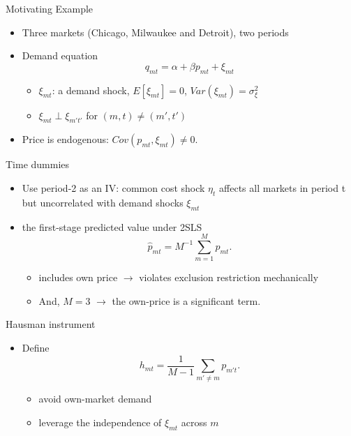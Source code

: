 \documentclass[notes,11pt, aspectratio=169]{beamer}
\begin{document}
\begin{frame}{Motivating Example}

\begin{itemize}

    \item Three markets (Chicago, Milwaukee and Detroit), two periods
    \item Demand equation
    \[
        q_{mt} = \alpha + \beta p_{mt} + \xi_{mt}
    \]
    \begin{itemize}
        \item $\xi_{mt}$: a demand shock, $E[\xi_{mt}] = 0$, $Var(\xi_{mt}) = \sigma_\xi^2$
        \item $\xi_{mt} \perp \xi_{m't'}$ for $(m,t) \neq (m',t')$
    \end{itemize}
    \item Price is endogenous: $Cov(p_{mt}, \xi_{mt}) \neq 0$.
    
\end{itemize}
    
\end{frame}

\begin{frame}{Time dummies}

\begin{itemize}
    \item Use period-2 as an IV: common cost shock $\eta_t$ affects all markets in period t but uncorrelated with demand shocks $\xi_{mt}$
    \item the first-stage predicted value under 2SLS 
    \[
     \hat{p}_{mt} = M^{-1}\sum_{m=1}^{M}p_{mt}.
    \]
    \begin{itemize}
        \item includes own price $\rightarrow$ violates exclusion restriction mechanically
        \item And, $M=3$ $\rightarrow$ the own-price is a significant term.
    \end{itemize}
\end{itemize}
    
\end{frame}

\begin{frame}{Hausman instrument}

\begin{itemize}
    \item Define 
    \[
     h_{mt} = \frac{1}{M-1} \sum_{m' \neq m} p_{m't}.
    \]
    \begin{itemize}
        \item avoid own-market demand 
        \item leverage the independence of $\xi_{mt}$ across $m$
    \end{itemize}
\end{itemize}
    
\end{frame}
\end{document}
